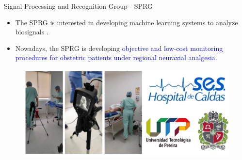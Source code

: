 \documentclass[aspectratio=169]{beamer}
\let\oldcite\cite %
\renewcommand{\cite}[1]{{\tiny\oldcite{#1}}}
\begin{document}




\begin{frame}{Signal Processing and Recognition Group - SPRG}
\begin{itemize}
    \item The SPRG is interested in developing machine learning systems to analyze biosignals \cite{BRON2015562, jimenez20183d,jimenez2021}. 
    \item Nowadays, the SPRG is developing \textcolor{blue}{objective and low-cost monitoring procedures for obstetric patients under regional neuraxial analgesia}.
\end{itemize}


\begin{figure}
    \centering
    \includegraphics[width=0.7\linewidth]{Figures/ses_unal_utp.pdf}
\end{figure}

\end{frame}
\end{document}
